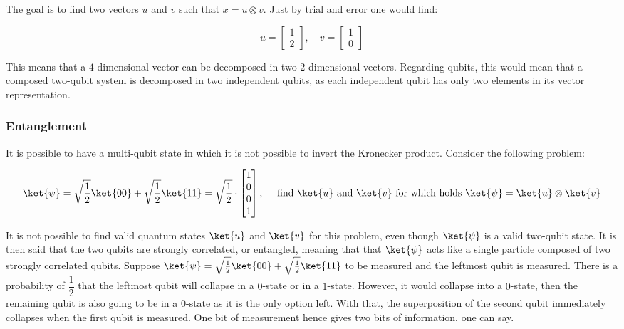 \documentclass[../main.tex]{subfiles}
\begin{document}
The goal is to find two vectors $u$ and $v$ such that $x = u \otimes v$. Just by trial and error one would find:

\begin{equation*}
    u = \begin{bmatrix} 1 \\ 2 \end{bmatrix}, \quad  v = \begin{bmatrix} 1 \\ 0 \end{bmatrix}
\end{equation*}

This means that a $4$-dimensional vector can be decomposed in two $2$-dimensional vectors. Regarding qubits, this would mean that a composed two-qubit system is decomposed in two independent qubits, as each independent qubit has only two elements in its vector representation.

\subsubsection*{Entanglement}
It is possible to have a multi-qubit state in which it is not possible to invert the Kronecker product. Consider the following problem:

\begin{equation*}
    \ket{\psi} = \sqrt{\frac{1}{2}} \ket{00} + \sqrt{\frac{1}{2}} \ket{11} = \sqrt{\frac{1}{2}} \cdot \begin{bmatrix} 1 \\ 0 \\ 0 \\ 1 \end{bmatrix}, \quad  \text{ find } \ket{u} \text{ and } \ket{v} \text{ for which holds } \ket{\psi} = \ket{u} \otimes \ket{v}
\end{equation*}

It is not possible to find valid quantum states $\ket{u}$ and $\ket{v}$ for this problem, even though $\ket{\psi}$ is a valid two-qubit state. It is then said that the two qubits are strongly correlated, or entangled, meaning that that $\ket{\psi}$ acts like a single particle composed of two strongly correlated qubits. Suppose $\ket{\psi} = \sqrt{\frac{1}{2}} \ket{00} + \sqrt{\frac{1}{2}} \ket{11}$ to be measured and the leftmost qubit is measured. There is a probability of $\dfrac{1}{2}$ that the leftmost qubit will collapse in a $0$-state or in a $1$-state. However, it would collapse into a $0$-state, then the remaining qubit is also going to be in a $0$-state as it is the only option left. With that, the superposition of the second qubit immediately collapses when the first qubit is measured. One bit of measurement hence gives two bits of information, one can say.
\end{document}
